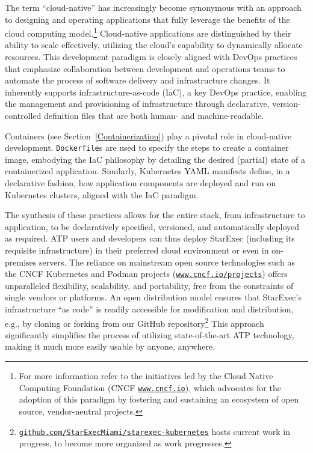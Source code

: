 \documentclass{easychair}
\begin{document}
The term ``cloud-native'' has increasingly become synonymous with an approach to designing and 
operating applications that fully leverage the benefits of the cloud computing model.\footnote{%
For more information refer to the initiatives led by the Cloud Native Computing Foundation (CNCF 
\href{https://www.cncf.io/}{\tt www.cncf.io}), which advocates for the adoption of this paradigm
by fostering and sustaining an ecosystem of open source, vendor-neutral projects.}
Cloud-native applications are distinguished by their ability to scale effectively, utilizing 
the cloud's capability to dynamically allocate resources. 
This development paradigm is closely aligned with DevOps practices that emphasize collaboration 
between development and operations teams to automate the process of software delivery and 
infrastructure changes. 
It inherently supports infrastructure-as-code (IaC), a key DevOps practice, enabling the management 
and provisioning of infrastructure through declarative, version-controlled definition files that 
are both human- and machine-readable.

Containers (see Section~\ref{Containerization}) play a pivotal role in cloud-native development. 
{\tt Dockerfile}s are used to specify the steps to create a container image, embodying the IaC 
philosophy by detailing the desired (partial) state of a containerized application. 
Similarly, Kubernetes YAML manifests define, in a declarative fashion, how application components 
are deployed and run on Kubernetes clusters, aligned with the IaC paradigm.

The synthesis of these practices allows for the entire stack, from infrastructure to application, 
to be declaratively specified, versioned, and automatically deployed as required. 
ATP users and developers can thus deploy StarExec (including its requisite infrastructure) in 
their preferred cloud environment or even in on-premises servers. 
The reliance on mainstream open source technologies such as the CNCF Kubernetes and Podman
projects (\href{https://www.cncf.io/projects/}{\tt www.cncf.io/projects}) offers unparalleled 
flexibility, scalability, and portability, free from the constraints of single vendors or 
platforms.
An open distribution model ensures that StarExec's infrastructure ``as code'' is readily 
accessible for modification and distribution, e.g., by cloning or forking from our GitHub 
repository\footnote{%
\href{https://github.com/StarExecMiami/starexec-kubernetes}{\tt github.com/StarExecMiami/starexec-kubernetes} 
hosts current work in progress, to become more organized as work progresses.}
This approach significantly simplifies the process of utilizing state-of-the-art ATP technology, 
making it much more easily usable by anyone, anywhere.
\end{document}
